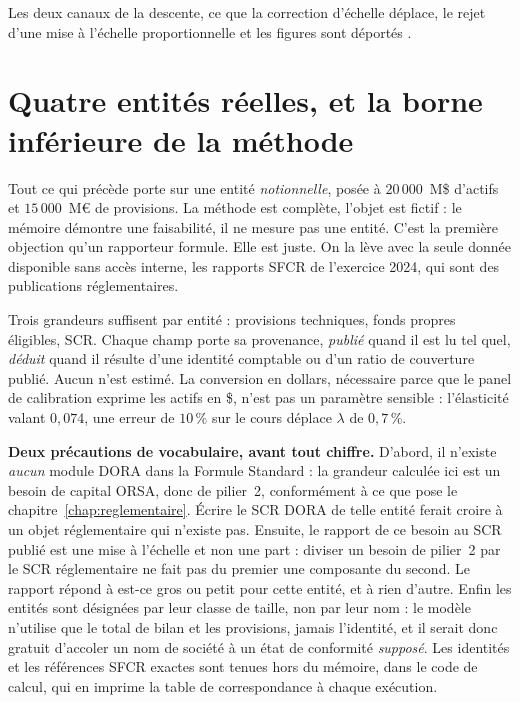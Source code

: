 Les deux canaux de la descente, ce que la correction d'échelle déplace, le rejet d'une mise à
l'échelle proportionnelle et les figures sont déportés \matcomp.

\section{Quatre entités réelles, et la borne inférieure de la méthode}
\label{sec:entites-reelles}

Tout ce qui précède porte sur une entité \emph{notionnelle}, posée à $20\,000$~M\$ d'actifs et
$15\,000$~M\euro{} de provisions. La méthode est complète, l'objet est fictif : le mémoire
démontre une faisabilité, il ne mesure pas une entité. C'est la première objection qu'un
rapporteur formule. Elle est juste. On la lève avec la seule donnée disponible sans accès
interne, les rapports SFCR de l'exercice 2024, qui sont des publications
réglementaires.

Trois grandeurs suffisent par entité : provisions techniques, fonds propres éligibles,
SCR. Chaque champ porte sa provenance, \emph{publié} quand il est lu tel quel,
\emph{déduit} quand il résulte d'une identité comptable ou d'un ratio de couverture publié.
Aucun n'est estimé. La conversion en dollars, nécessaire parce que le panel de calibration
exprime les actifs en \$, n'est pas un paramètre sensible : l'élasticité valant $0{,}074$, une
erreur de $10\,\%$ sur le cours déplace $\lambda$ de $0{,}7\,\%$.

\begin{attention}
\textbf{Deux précautions de vocabulaire, avant tout chiffre.} D'abord, il n'existe \emph{aucun}
module DORA dans la Formule Standard : la grandeur calculée ici est un besoin de
capital ORSA, donc de pilier~2, conformément à ce que pose le
chapitre~\ref{chap:reglementaire}. Écrire \og le SCR DORA de telle entité\fg{} ferait
croire à un objet réglementaire qui n'existe pas. Ensuite, le rapport de ce besoin au SCR
publié est une mise à l'échelle et non une part : diviser un besoin de pilier~2 par le
SCR réglementaire ne fait pas du premier une composante du second. Le rapport répond à
\og est-ce gros ou petit pour cette entité\fg{}, et à rien d'autre. Enfin les entités sont désignées
par leur classe de taille, non par leur nom : le modèle n'utilise que le total de bilan et les
provisions, jamais l'identité, et il serait donc gratuit d'accoler un nom de société à un état de
conformité \emph{supposé}. Les identités et les références SFCR exactes sont tenues hors
du mémoire, dans le code de calcul, qui en imprime la table de correspondance à chaque exécution.
\end{attention}

